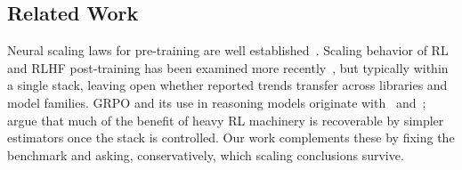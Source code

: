 \subsection{Related Work}
\label{sec:p1-related}
Neural scaling laws for pre-training are well established~\citep{kaplan2020scalinglaws, hoffmann2022chinchilla, muennighoff2023datascaling}. Scaling behavior of RL and
RLHF post-training has been examined more recently~\citep{hilton2023rlscaling, rafailov2024rlhfscaling, nimmaturi2025predictive}, but typically within a single
stack, leaving open whether reported trends transfer across libraries and model
families. GRPO and its use in reasoning models originate
with~\citet{shao2024deepseekmath} and~\citet{guo2025deepseekr1};
\citet{ahmadian2024backtobasics} argue that much of the benefit of heavy RL
machinery is recoverable by simpler estimators once the stack is controlled. Our
work complements these by fixing the benchmark and asking, conservatively, which
scaling conclusions survive.
